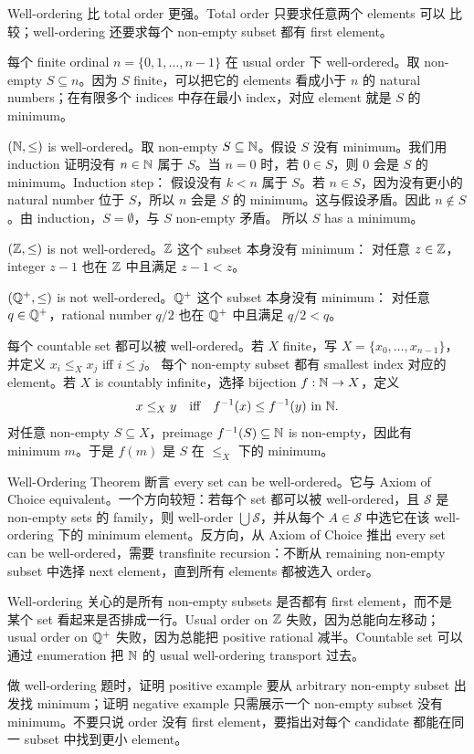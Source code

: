 \begin{solution}
Well-ordering 比 total order 更强。Total order 只要求任意两个 elements 可以
比较；well-ordering 还要求每个 non-empty subset 都有 first element。

每个 finite ordinal \(n=\{0,1,\ldots,n-1\}\) 在 usual order 下
well-ordered。取 non-empty \(S\subseteq n\)。因为 \(S\) finite，可以把它的
elements 看成小于 \(n\) 的 natural numbers；在有限多个 indices 中存在最小
index，对应 element 就是 \(S\) 的 minimum。

\((\mathbb{N},\le)\) is well-ordered。取 non-empty \(S\subseteq\mathbb{N}\)。假设 \(S\)
没有 minimum。我们用 induction 证明没有 \(n\in\mathbb{N}\) 属于 \(S\)。当
\(n=0\) 时，若 \(0\in S\)，则 \(0\) 会是 \(S\) 的 minimum。Induction step：
假设没有 \(k<n\) 属于 \(S\)。若 \(n\in S\)，因为没有更小的 natural number
位于 \(S\)，所以 \(n\) 会是 \(S\) 的 minimum。这与假设矛盾。因此
\(n\notin S\)。由 induction，\(S=\emptyset\)，与 \(S\) non-empty 矛盾。
所以 \(S\) has a minimum。

\((\mathbb{Z},\le)\) is not well-ordered。\(\mathbb{Z}\) 这个 subset 本身没有 minimum：
对任意 \(z\in\mathbb{Z}\)，integer \(z-1\) 也在 \(\mathbb{Z}\) 中且满足 \(z-1<z\)。

\((\mathbb{Q}^+,\le)\) is not well-ordered。\(\mathbb{Q}^+\) 这个 subset 本身没有 minimum：
对任意 \(q\in\mathbb{Q}^+\)，rational number \(q/2\) 也在 \(\mathbb{Q}^+\) 中且满足
\(q/2<q\)。

每个 countable set 都可以被 well-ordered。若 \(X\) finite，写
\(X=\{x_0,\ldots,x_{n-1}\}\)，并定义 \(x_i\le_X x_j\) iff \(i\le j\)。
每个 non-empty subset 都有 smallest index 对应的 element。若 \(X\) is
countably infinite，选择 bijection \(f:\mathbb{N}\to X\)，定义
\[
  x\le_X y
  \quad\text{iff}\quad
  f^{-1}(x)\le f^{-1}(y)\text{ in }\mathbb{N}.
\]
对任意 non-empty \(S\subseteq X\)，preimage \(f^{-1}(S)\subseteq\mathbb{N}\) is
non-empty，因此有 minimum \(m\)。于是 \(f(m)\) 是 \(S\) 在 \(\le_X\) 下的
minimum。

Well-Ordering Theorem 断言 every set can be well-ordered。它与 Axiom of
Choice equivalent。一个方向较短：若每个 set 都可以被 well-ordered，且
\(\mathcal S\) 是 non-empty sets 的 family，则 well-order
\(\bigcup\mathcal S\)，并从每个 \(A\in\mathcal S\) 中选它在该 well-ordering
下的 minimum element。反方向，从 Axiom of Choice 推出 every set can be
well-ordered，需要 transfinite recursion：不断从 remaining non-empty subset
中选择 next element，直到所有 elements 都被选入 order。
\end{solution}

\begin{explanation}
Well-ordering 关心的是所有 non-empty subsets 是否都有 first element，而不是
某个 set 看起来是否排成一行。Usual order on \(\mathbb{Z}\) 失败，因为总能向左移动；
usual order on \(\mathbb{Q}^+\) 失败，因为总能把 positive rational 减半。Countable
set 可以通过 enumeration 把 \(\mathbb{N}\) 的 usual well-ordering transport 过去。

做 well-ordering 题时，证明 positive example 要从 arbitrary non-empty
subset 出发找 minimum；证明 negative example 只需展示一个 non-empty subset
没有 minimum。不要只说 order 没有 first element，要指出对每个 candidate
都能在同一 subset 中找到更小 element。
\end{explanation}

